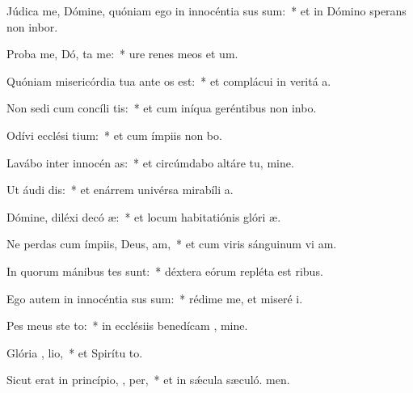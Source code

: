 \item Júdica me, Dómine, quóniam ego in innocéntia  sus sum:~* et in Dómino sperans non inbor.
\item Proba me, Dó,  ta me:~* ure renes meos et  um.
\item Quóniam misericórdia tua ante  os est:~* et complácui in veritá a.
\item Non sedi cum concíli tis:~* et cum iníqua geréntibus non inbo.
\item Odívi ecclési tium:~* et cum ímpiis non bo.
\item Lavábo inter innocén  as:~* et circúmdabo altáre tu, mine.
\item Ut áudi  dis:~* et enárrem univérsa mirabíli a.
\item Dómine, diléxi decó  æ:~* et locum habitatiónis glóri æ.
\item Ne perdas cum ímpiis, Deus,  am,~* et cum viris sánguinum vi am.
\item In quorum mánibus tes sunt:~* déxtera eórum repléta est ribus.
\item Ego autem in innocéntia  sus sum:~* rédime me, et miseré i.
\item Pes meus ste  to:~* in ecclésiis benedícam , mine.
\item Glória ,  lio,~* et Spirítu to.
\item Sicut erat in princípio,  ,  per,~* et in sǽcula sæculó. men.
